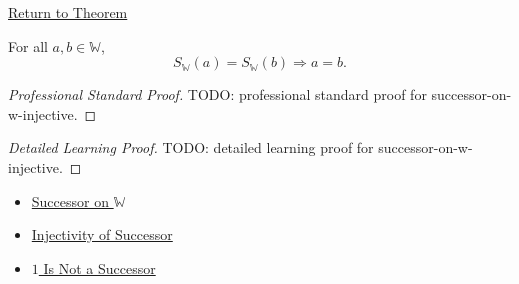 \newpage
{}
\label{prf:successor-on-w-injective}

\begin{remark*}[Return]
\hyperref[thm:successor-on-w-injective]{Return to Theorem}
\end{remark*}

\begin{theorem*}
For all $a,b\in\mathbb{W}$,
\[
S_{\mathbb{W}}(a)=S_{\mathbb{W}}(b)\Longrightarrow a=b.
\]
\end{theorem*}

\begin{proof}[Professional Standard Proof]
\LRAProofBodyStart
TODO: professional standard proof for successor-on-w-injective.
\end{proof}

\begin{proof}[Detailed Learning Proof]
\LRAProofBodyStart
TODO: detailed learning proof for successor-on-w-injective.
\end{proof}

\begin{remark*}
\end{remark*}

\begin{dependencies}
\begin{itemize}
  \item \hyperref[def:successor-on-w]{Successor on $\mathbb{W}$}
  \item \hyperref[ax:peano-successor-injective]{Injectivity of Successor}
  \item \hyperref[ax:peano-base-not-successor]{$1$ Is Not a Successor}
\end{itemize}
\end{dependencies}

\clearpage
